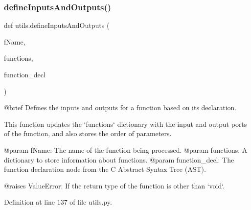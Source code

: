\subsubsection{\texorpdfstring{define\+Inputs\+And\+Outputs()}{defineInputsAndOutputs()}}
{\footnotesize\ttfamily def utils.\+define\+Inputs\+And\+Outputs (\begin{DoxyParamCaption}\item[{}]{f\+Name,  }\item[{}]{functions,  }\item[{}]{function\+\_\+decl }\end{DoxyParamCaption})}

\begin{DoxyVerb}@brief Defines the inputs and outputs for a function based on its declaration.

This function updates the `functions` dictionary with the input and output ports of the function,
and also stores the order of parameters.

@param fName: The name of the function being processed.
@param functions: A dictionary to store information about functions.
@param function_decl: The function declaration node from the C Abstract Syntax Tree (AST).

@raises ValueError: If the return type of the function is other than `void`.
\end{DoxyVerb}
 

Definition at line 137 of file utils.\+py.


